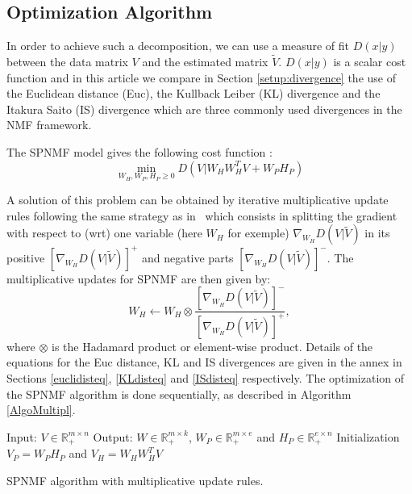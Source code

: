 \subsection{Optimization Algorithm}

In order to achieve such a decomposition, we can use a measure of fit $D(x|y)$ between the data matrix $V$ and the estimated matrix $\tilde{V}$. $D(x|y)$ is a scalar cost function and in this article we compare in Section \ref{setup:divergence} the use of the Euclidean distance (Euc), the Kullback Leiber (KL) divergence and the Itakura Saito (IS) divergence which are three commonly used divergences in the NMF framework.



The SPNMF model gives the following cost function : 
\begin{equation}\label{InitCost}
\min_{W_H,W_P,H_P \geq 0} D(V|W_{H}W_{H}^{T}V + W_{P} H_{P})  
\end{equation}

A solution of this problem can be obtained by iterative multiplicative update rules following the same strategy as in~\cite{yuanOja2005,Lee01algorithmsfor} which consists in splitting the gradient with respect to (wrt) one variable (here $W_H$ for exemple) $\nabla_{W_H} D(V|\tilde{V})$ in its positive $[\nabla_{W_H} D(V|\tilde{V})]^{+}$ and negative parts $[\nabla_{W_H} D(V|\tilde{V})]^{-}$.
The multiplicative updates for SPNMF are then given by: 
$$W_{H} \leftarrow W_{H} \otimes \frac{ [\nabla_{W_H} D(V|\tilde{V})]^{-} }{[\nabla_{W_H} D(V|\tilde{V})]^{+}}, $$
where $\otimes$ is the Hadamard product or element-wise product. Details of the equations for the Euc distance, KL and IS divergences are given in the annex in Sections \ref{euclidisteq}, \ref{KLdisteq} and \ref{ISdisteq} respectively. 
The optimization of the SPNMF algorithm is done sequentially, as described in Algorithm \ref{AlgoMultipl}.

\begin{algorithm}[h]
 Input: $V \in \mathbb{R}_{+}^{m \times n} $
 Output: $W \in \mathbb{R}_{+}^{m \times k}$, $W_P \in \mathbb{R}_+^{m \times e}$ and $H_P \in \mathbb{R}_{+}^{e \times n}$
 Initialization\;
 $ V_P = W_PH_P $ and
 $ V_H = W_HW_H^TV $ 
  
 \vspace{0.2cm}
 \caption{SPNMF algorithm with multiplicative update rules.}\label{AlgoMultipl}
\end{algorithm}


